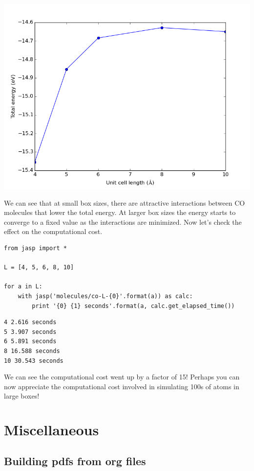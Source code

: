 \documentclass[11pt]{article}
\begin{document}
\includegraphics[width=.9\linewidth]{./images/co-e-v.png}


We can see that at small box sizes, there are attractive interactions between CO molecules that lower the total energy. At larger box sizes the energy starts to converge to a fixed value as the interactions are minimized. Now let's check the effect on the computational cost.

\begin{verbatim}
from jasp import *

L = [4, 5, 6, 8, 10]

for a in L:
    with jasp('molecules/co-L-{0}'.format(a)) as calc:
        print '{0} {1} seconds'.format(a, calc.get_elapsed_time())
\end{verbatim}

\begin{verbatim}
4 2.616 seconds
5 3.907 seconds
6 5.891 seconds
8 16.588 seconds
10 30.543 seconds
\end{verbatim}

We can see the computational cost went up by a factor of 15! Perhaps you can now appreciate the computational cost involved in simulating 100s of atoms in large boxes!




\section{Miscellaneous}
\label{sec-8}

\subsection{Building pdfs from org files}
\label{sec-8-1}
\end{document}
